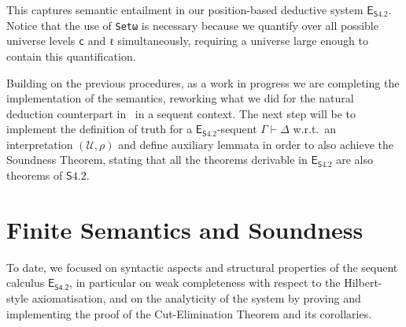 \documentclass{article}
\newcommand{\seq}[2]{{#1} \vdash{} {#2}}
\newcommand{\logic}{\mathsf{S4.2}}
\newcommand{\calculus}{\mathsf{E}_{\logic}}
\newcommand{\eseq}{\mathsf{E}_{{\textsf{S4.2}}}}
\theoremstyle{definition}
\begin{document}
{{This captures semantic entailment in our position-based deductive system $\calculus$. Notice that the use of \texttt{Setω} is necessary because we quantify over all possible universe levels \texttt{c} and \texttt{ℓ} simultaneously, requiring a universe large enough to contain this quantification.


Building on the previous procedures, as a work in progress we are completing the implementation of the semantics, reworking what we did for the natural deduction counterpart in~\cite{Martini2024:S42NaturalDeduction} in a sequent context. The next step will be to implement the definition of truth for a $\calculus$-sequent $\seq{\Gamma}{\Delta}$ w.r.t.\ an interpretation $(\mathcal{U}, \rho)$ and define auxiliary lemmata in order to also achieve the Soundness Theorem, stating that all the theorems derivable in $\calculus$ are also theorems of $\logic$.%








}
}%


\section{Finite Semantics and Soundness}\label{sec:finite-semantics}
To date, we focused on syntactic aspects and structural properties of the sequent calculus $\eseq$, in particular on weak completeness with respect to the Hilbert-style axiomatisation, and on the analyticity of the system by proving and implementing the proof of the Cut-Elimination Theorem and its corollaries.
\end{document}
